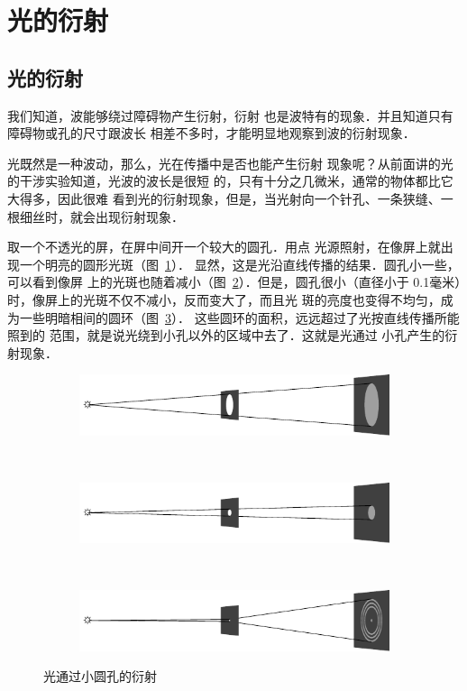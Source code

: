 \section{光的衍射}
\subsection{光的衍射}

我们知道，波能够绕过障碍物产生衍射，衍射
也是波特有的现象．并且知道只有障碍物或孔的尺寸跟波长
相差不多时，才能明显地观察到波的衍射现象．

光既然是一种波动，那么，光在传播中是否也能产生衍射
现象呢？从前面讲的光的干涉实验知道，光波的波长是很短
的，只有十分之几微米，通常的物体都比它大得多，因此很难
看到光的衍射现象，但是，当光射向一个针孔、一条狭缝、一
根细丝时，就会出现衍射现象．

取一个不透光的屏，在屏中间开一个较大的圆孔．用点
光源照射，在像屏上就出现一个明亮的圆形光斑（图~\ref{fig_C_6-7a}）．
显然，这是光沿直线传播的结果．圆孔小一些，可以看到像屏
上的光斑也随着减小（图~\ref{fig_C_6-7b}）．但是，圆孔很小（直径小于
0.1毫米）时，像屏上的光斑不仅不减小，反而变大了，而且光
斑的亮度也变得不均匀，成为一些明暗相间的圆环（图~\ref{fig_C_6-7c}）．
这些圆环的面积，远远超过了光按直线传播所能照到的
范围，就是说光绕到小孔以外的区域中去了．这就是光通过
小孔产生的衍射现象．
\begin{figure}[htbp]
    \centering
    \begin{subfigure}{0.8\linewidth}
        \centering
        \includegraphics{fig/C/6-7a.pdf}
        \caption{}\label{fig_C_6-7a}
    \end{subfigure}
    \\
    \begin{subfigure}{0.8\linewidth}
        \centering
        \includegraphics{fig/C/6-7b.pdf}
        \caption{}\label{fig_C_6-7b}
    \end{subfigure}
    \\
    \begin{subfigure}{0.8\linewidth}
        \centering
        \includegraphics{fig/C/6-7c.pdf}
        \caption{}\label{fig_C_6-7c}
    \end{subfigure}
    \caption{光通过小圆孔的衍射}\label{fig_C_6-7}
\end{figure}

